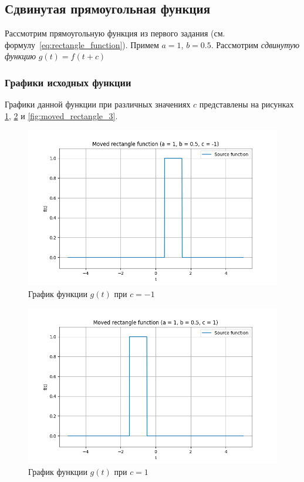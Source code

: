 \subsection{Сдвинутая прямоугольная функция}
Рассмотрим прямоугольную функция из первого задания (см. формулу~\eqref{eq:rectangle_function}). Примем $a = 1$, $b = 0.5$. 
Рассмотрим \textit{сдвинутую функцию} $g(t) = f(t + c)$

\subsubsection{Графики исходных функции}
Графики данной функции при различных значениях $c$ представлены на рисунках \ref{fig:moved_rectangle_1}, \ref{fig:moved_rectangle_2} и \ref{fig:moved_rectangle_3}.

\begin{figure}[ht!]
    \centering
    \includegraphics[width=\textwidth]{media/moved_rectangle_1.png}
    \caption{График функции $g(t)$ при $c = -1$}
    \label{fig:moved_rectangle_1}
\end{figure}

\begin{figure}[ht!]
    \centering
    \includegraphics[width=\textwidth]{media/moved_rectangle_2.png}
    \caption{График функции $g(t)$ при $c = 1$}
    \label{fig:moved_rectangle_2}
\end{figure}

